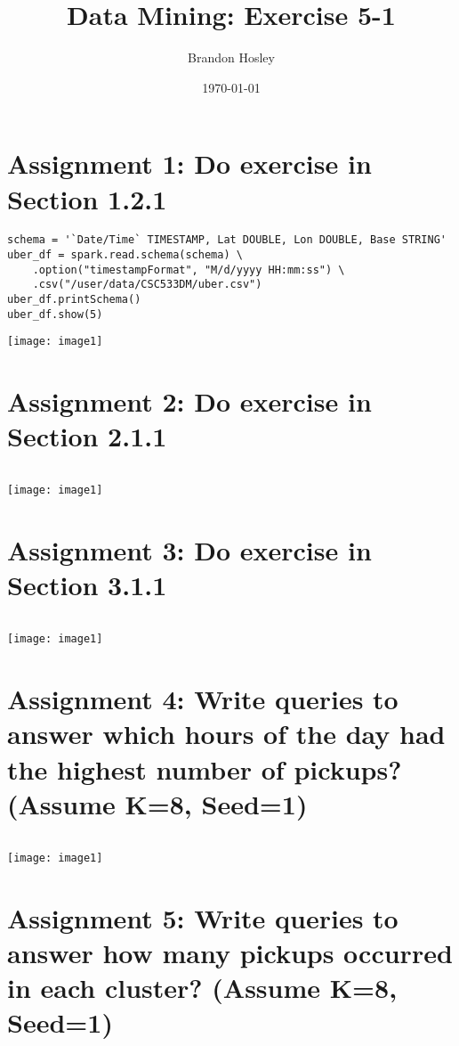 \documentclass[]{article}
\title{Data Mining: Exercise 5-1}
\author{Brandon Hosley}
\date{\today}
\begin{document}
\maketitle

\section*{Assignment 1: Do exercise in Section 1.2.1}

\begin{verbatim}
schema = '`Date/Time` TIMESTAMP, Lat DOUBLE, Lon DOUBLE, Base STRING'
uber_df = spark.read.schema(schema) \
	.option("timestampFormat", "M/d/yyyy HH:mm:ss") \
	.csv("/user/data/CSC533DM/uber.csv")
uber_df.printSchema()
uber_df.show(5)
\end{verbatim}
\texttt{[image: image1]}

\section*{Assignment 2: Do exercise in Section 2.1.1}

\begin{verbatim}

\end{verbatim}
\texttt{[image: image1]}


\section*{Assignment 3: Do exercise in Section 3.1.1}

\begin{verbatim}

\end{verbatim}
\texttt{[image: image1]}


\section*{Assignment 4: Write queries to answer which hours of the day had the highest number of pickups? (Assume K=8, Seed=1)}

\begin{verbatim}

\end{verbatim}
\texttt{[image: image1]}

\section*{Assignment 5: Write queries to answer how many pickups occurred in each cluster? (Assume K=8, Seed=1)}
\end{document}
